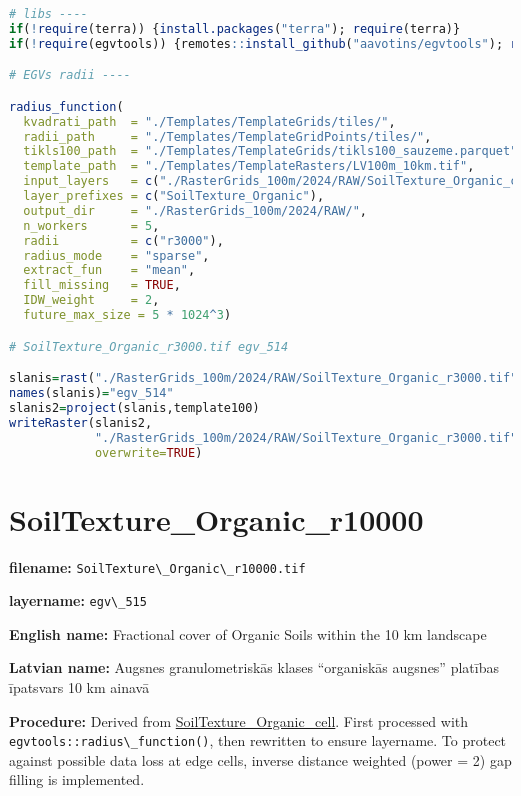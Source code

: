 \documentclass[
]{book}
\newcommand{\passthrough}[1]{#1}
\begin{document}
\begin{lstlisting}[language=R]
# libs ----
if(!require(terra)) {install.packages("terra"); require(terra)}
if(!require(egvtools)) {remotes::install_github("aavotins/egvtools"); require(egvtools)}

# EGVs radii ----

radius_function(
  kvadrati_path  = "./Templates/TemplateGrids/tiles/",
  radii_path     = "./Templates/TemplateGridPoints/tiles/",
  tikls100_path  = "./Templates/TemplateGrids/tikls100_sauzeme.parquet",
  template_path  = "./Templates/TemplateRasters/LV100m_10km.tif",
  input_layers   = c("./RasterGrids_100m/2024/RAW/SoilTexture_Organic_cell.tif"),
  layer_prefixes = c("SoilTexture_Organic"),
  output_dir     = "./RasterGrids_100m/2024/RAW/",
  n_workers      = 5,
  radii          = c("r3000"),
  radius_mode    = "sparse",
  extract_fun    = "mean",
  fill_missing   = TRUE,
  IDW_weight     = 2,
  future_max_size = 5 * 1024^3)

# SoilTexture_Organic_r3000.tif egv_514

slanis=rast("./RasterGrids_100m/2024/RAW/SoilTexture_Organic_r3000.tif")
names(slanis)="egv_514"
slanis2=project(slanis,template100)
writeRaster(slanis2,
            "./RasterGrids_100m/2024/RAW/SoilTexture_Organic_r3000.tif",
            overwrite=TRUE)
\end{lstlisting}

\section{SoilTexture\_Organic\_r10000}\label{ch06.515}

\textbf{filename:} \passthrough{\lstinline!SoilTexture\_Organic\_r10000.tif!}

\textbf{layername:} \passthrough{\lstinline!egv\_515!}

\textbf{English name:} Fractional cover of Organic Soils within the 10 km landscape

\textbf{Latvian name:} Augsnes granulometriskās klases ``organiskās augsnes'' platības īpatsvars 10 km ainavā

\textbf{Procedure:} Derived from \hyperref[ch06.511]{SoilTexture\_Organic\_cell}. First processed
with \passthrough{\lstinline!egvtools::radius\_function()!}, then rewritten to ensure layername. To protect against
possible data loss at edge cells, inverse distance weighted (power = 2) gap filling
is implemented.
\end{document}
